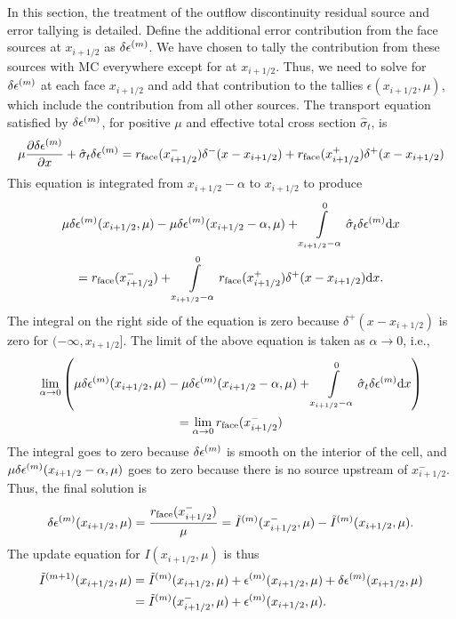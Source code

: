In this section, the treatment of the outflow discontinuity residual source and error
tallying is detailed.  Define the additional error contribution from the face
sources at $x_{i+1/2}$ as $\delta\epsilon^{(m)}$. We have chosen to tally the contribution from these
sources with MC everywhere except for at $x_{i+1/2}$.  Thus, we need to solve for $\delta\epsilon^{(m)}$
at each face $x_{i+1/2}$ and add that contribution to the tallies
$\epsilon(x_{i+1/2},\mu)$, which include the contribution from all other sources.  The transport equation satisfied by $\delta\epsilon^{(m)}$, for positive
$\mu$ and effective total cross 
section $\hat \sigma_t$, is
\begin{equation}
    \label{eq:ho_face}
    \mu \frac{\partial \delta\epsilon^{(m)}}{\partial x} + \hat\sigma_t \delta\epsilon^{(m)} = r_{\text{face}}(x_{i+1/2}^-)\delta^-(x - x_{i+1/2}) + r_{\text{face}}(x_{i+1/2}^+)\delta^+(x - x_{i+1/2}) 
\end{equation}
This equation is integrated from $x_{i+1/2}-\alpha$ to $x_{i+1/2}$ to produce
\begin{multline}
    \mu\delta\epsilon^{(m)}(x_{i+1/2},\mu) - \mu\delta\epsilon^{(m)}(x_{i+1/2}-\alpha,\mu)  + \int\limits_{x_{i+1/2}-\alpha}^0 
    \hat \sigma_t \delta\epsilon^{(m)} \mathrm{d} x  \\ =  r_{\text{face}}(x_{i+1/2}^-) +
        \int\limits_{x_{i+1/2}-\alpha}^0r_{\text{face}}(x_{i+1/2}^+)\delta^+(x - x_{i+1/2}) \mathrm{d} x.
\end{multline}
The integral on the right side of the equation is zero because $\delta^+(x-x_{i+1/2})$ is
zero for $(-\infty,x_{i+1/2}]$.  The limit of the above equation is taken as $\alpha\to0$, i.e.,
\begin{multline}
    \lim_{\alpha\to0}\left( \mu\delta\epsilon^{(m)}(x_{i+1/2},\mu) - \mu\delta\epsilon^{(m)}(x_{i+1/2}-\alpha,\mu)  + \int\limits_{x_{i+1/2}-\alpha}^0 
    \hat \sigma_t \delta\epsilon^{(m)} \mathrm{d} x \right)  \\= \lim_{\alpha\to0} r_{\text{face}}(x_{i+1/2}^-) 
\end{multline}
The integral goes to zero because $\delta\epsilon^{(m)}$ is smooth on the interior of the cell, and
$\mu\delta\epsilon^{(m)}(x_{i+1/2}-\alpha,\mu)$ goes to zero because there is no source upstream of
$x_{i+1/2}^-$. Thus, the final solution is
\begin{equation}
    \delta\epsilon^{(m)}(x_{i+1/2},\mu) = \frac{r_{\text{face}}(x_{i+1/2}^-)}{\mu} = 
     \tilde I^{(m)}(x_{i+1/2}^-,\mu) - \tilde I^{(m)}(x_{i+1/2},\mu)
.
\end{equation}
The update equation for $I(x_{i+1/2},\mu)$ is thus
\begin{align}
   \tilde I^{(m+1)}(x_{i+1/2},\mu) &= \tilde I^{(m)}(x_{i+1/2},\mu) + \epsilon^{(m)}(x_{i+1/2},\mu) +
    \delta\epsilon^{(m)}(x_{i+1/2},\mu) \\ 
        &= \tilde I^{(m)}(x_{i+1/2}^-,\mu) + \epsilon^{(m)}(x_{i+1/2},\mu).
\end{align}


